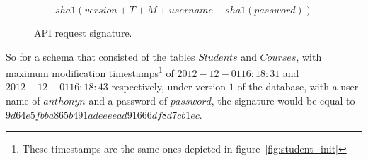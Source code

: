 \begin{figure}[h!]
\[
sha1(version + T + M + username + sha1(password))
\]
\caption{API request signature.}
\label{fig:signature}
\end{figure}

So for a schema that consisted of the tables $Students$ and $Courses$, with
maximum modification timestamps\footnote{These timestamps are the same ones
depicted in figure~\ref{fig:student_init}} of $2012-12-01 16:18:31$ and
$2012-12-01 16:18:43$ respectively, under version $1$ of the database, with a
user name of $anthonyn$ and a password of $password$, the signature would be
equal to \hbox{$9d64e5fbba865b491adeeeead91666df8d7cb1ec$}.



